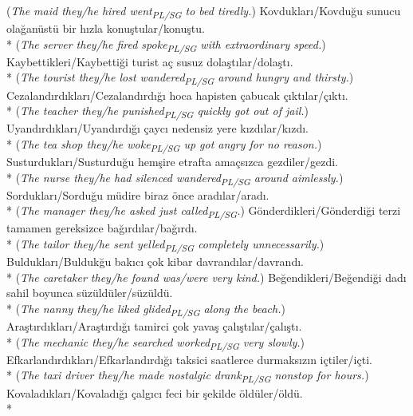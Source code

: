 ({\it The maid they/he hired went\textsubscript{PL/SG} to bed tiredly.})
\ex Kovduklar{\i}/Kovdu\u{g}u sunucu ola\u{g}an\"{u}st\"{u} bir h{\i}zla konu\c{s}tular/konu\c{s}tu.\\*
({\it The server they/he fired spoke\textsubscript{PL/SG} with extraordinary speed.})
\ex Kaybettikleri/Kaybetti\u{g}i turist a\c{c} susuz dola\c{s}t{\i}lar/dola\c{s}t{\i}.\\*
({\it The tourist they/he lost wandered\textsubscript{PL/SG} around hungry and thirsty.})
\ex Cezaland{\i}rd{\i}klar{\i}/Cezaland{\i}rd{\i}\u{g}{\i} hoca hapisten \c{c}abucak \c{c}{\i}kt{\i}lar/\c{c}{\i}kt{\i}.\\*
({\it The teacher they/he punished\textsubscript{PL/SG} quickly got out of jail.})
\ex Uyand{\i}rd{\i}klar{\i}/Uyand{\i}rd{\i}\u{g}{\i} \c{c}ayc{\i} nedensiz yere k{\i}zd{\i}lar/k{\i}zd{\i}.\\*
({\it The tea shop they/he woke\textsubscript{PL/SG} up got angry for no reason.})
\ex Susturduklar{\i}/Susturdu\u{g}u hem\c{s}ire etrafta ama\c{c}s{\i}zca gezdiler/gezdi.\\*
({\it The nurse they/he had silenced wandered\textsubscript{PL/SG} around aimlessly.})
\ex Sorduklar{\i}/Sordu\u{g}u m\"{u}dire biraz \"{o}nce arad{\i}lar/arad{\i}.\\*
({\it The manager they/he asked just called\textsubscript{PL/SG}.})
\ex G\"{o}nderdikleri/G\"{o}nderdi\u{g}i terzi tamamen gereksizce ba\u{g}{\i}rd{\i}lar/ba\u{g}{\i}rd{\i}.\\*
({\it The tailor they/he sent yelled\textsubscript{PL/SG} completely unnecessarily.})
\ex Bulduklar{\i}/Bulduk\u{g}u bak{\i}c{\i} \c{c}ok kibar davrand{\i}lar/davrand{\i}.\\*
({\it The caretaker they/he found was/were very kind.})
\ex Be\u{g}endikleri/Be\u{g}endi\u{g}i dad{\i} sahil boyunca s\"{u}z\"{u}ld\"{u}ler/s\"{u}z\"{u}ld\"{u}.\\*
({\it The nanny they/he liked glided\textsubscript{PL/SG} along the beach.})
\ex Ara\c{s}t{\i}rd{\i}klar{\i}/Ara\c{s}t{\i}rd{\i}\u{g}{\i} tamirci \c{c}ok yava\c{s} \c{c}al{\i}\c{s}t{\i}lar/\c{c}al{\i}\c{s}t{\i}.\\*
({\it The mechanic they/he searched worked\textsubscript{PL/SG} very slowly.})
\ex Efkarland{\i}rd{\i}klar{\i}/Efkarland{\i}rd{\i}\u{g}{\i} taksici saatlerce durmaks{\i}z{\i}n i\c{c}tiler/i\c{c}ti.\\*
({\it The taxi driver they/he made nostalgic drank\textsubscript{PL/SG} nonstop for hours.})
\ex Kovalad{\i}klar{\i}/Kovalad{\i}\u{g}{\i} \c{c}alg{\i}c{\i} feci bir \c{s}ekilde \"{o}ld\"{u}ler/\"{o}ld\"{u}.\\*
